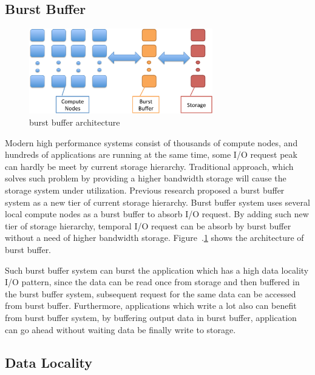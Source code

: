 \subsection{Burst Buffer}
\begin{figure}
\centering
\includegraphics[width=8cm]{img/burst_buffer.pdf}
\caption{burst buffer architecture}
\label{background:burst buffer architecture}
\end{figure}

Modern high performance systems consist of thousands of compute nodes, and hundreds of
applications are running at the same time, some I/O request peak can hardly be meet by current
storage hierarchy. 
Traditional approach, which solves such problem by providing a higher bandwidth storage will cause
the storage system under utilization.
Previous research\cite{on_the_role_of_burst_buffers} proposed a
burst buffer system as a new tier of current storage hierarchy.
Burst buffer system uses several local compute nodes as a burst buffer to absorb I/O
request. 
By adding such new tier of storage hierarchy, temporal I/O request can be absorb by burst buffer
without a need of higher bandwidth storage. Figure~.\ref{background:burst buffer architecture}
shows the architecture of burst buffer.

Such burst buffer system can burst the application which has a high data locality I/O pattern, since
the data can be read once from storage and then buffered in the burst buffer system, subsequent
request for the same data can be accessed from burst buffer.
Furthermore, applications which write a lot also can benefit from burst buffer system, by buffering
output data in burst buffer, application can go ahead without waiting data be finally write to
storage.

\subsection{Data Locality}

